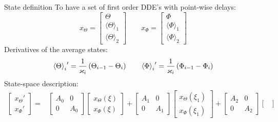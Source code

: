 \documentclass{beamer}
\begin{document}
\begin{frame}{State definition} To have a set of first order DDE's with point-wise delays:
			\small	\begin{equation*}
				x_\Theta = \begin{bmatrix}
				\Theta \\
				\langle \Theta \rangle_1\\
				\langle\Theta \rangle_2 
				\end{bmatrix} \qquad
				x_\Phi = \begin{bmatrix}
				\Phi \\
				\langle \Phi \rangle_1\\
				\langle\Phi \rangle_2 
				\end{bmatrix}
				\end{equation*}
				Derivatives of the average states:
				\begin{equation*}
				{{\rm{\langle\Theta\rangle }}_i}'= \frac{1}{\varkappa_i}\left(\Theta_{i-1}-\Theta_{i}\right) \qquad
				{{\rm{\langle\Phi\rangle }}_i}'=\frac{1}{\varkappa_i}\left(\Phi_{i-1}-\Phi_{i}\right)
				\label{eq:derivativeaverage}
				\end{equation*}
				State-space description:
				\small \begin{align*}
								\begin{bmatrix}
								x_\Theta' \\
								x_\Phi'
								\end{bmatrix} =&
								\begin{bmatrix}
								A_0 & 0 \\
								0 & A_0
								\end{bmatrix}
								\begin{bmatrix}
								x_\Theta(\xi) \\
								x_\Phi(\xi)
								\end{bmatrix} + 
								\begin{bmatrix}
								A_1 & 0 \\
								0 & A_1
								\end{bmatrix}
								\begin{bmatrix}
								x_\Theta(\xi_1) \\
								x_\Phi(\xi_1)
								\end{bmatrix} +
								\begin{bmatrix}
								A_2 & 0 \\
								0 & A_2
								\end{bmatrix}
								\begin{bmatrix}

\end{bmatrix}
\end{align*}
\end{frame}
\end{document}
